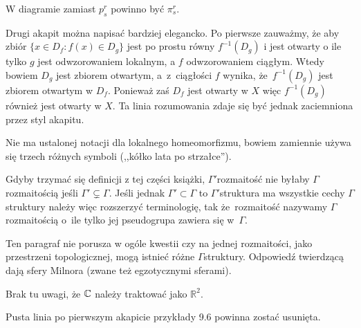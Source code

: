 \documentclass[a4paper,11pt]{article}
\begin{document}
\start {} W diagramie zamiast $p^{ r }_{ s }$ powinno być
$\pi^{ r }_{ s }$.

\start {} Drugi akapit można napisać bardziej elegancko. Po
pierwsze zauważmy, że aby zbiór\linebreak
$\{ x \in D_{ f } : f( x ) \in D_{ g } \}$ jest po prostu równy
$f^{ -1 }( D_{ g } )$ i jest otwarty o ile tylko $g$ jest
odwzorowaniem lokalnym, a $f$ odwzorowaniem ciągłym. Wtedy bowiem
$D_{ g }$ jest zbiorem otwartym, a~z~ciągłości $f$ wynika,
że~$f^{ -1 }( D_{ g } )$ jest zbiorem otwartym w $D_{ f }$. Ponieważ
zaś $D_{ f }$ jest otwarty w $X$ więc $f^{ -1 }( D_{ g } )$ również
jest otwarty w $X$. Ta linia rozumowania zdaje się być jednak
zaciemniona przez styl akapitu.

\start {} Nie ma ustalonej notacji dla lokalnego homeomorfizmu,
bowiem zamiennie używa się trzech różnych symboli (,,kółko lata po
strzałce'').

\start {} Gdyby trzymać się definicji z tej części książki,
$\Gamma'$\dywiz rozmaitość nie byłaby $\Gamma$\dywiz rozmaitością
jeśli $\Gamma' \subsetneq \Gamma$. Jeśli jednak
$\Gamma' \subset \Gamma$ to $\Gamma'$\dywiz struktura ma wszystkie
cechy $\Gamma$\dywiz struktury należy więc rozszerzyć terminologię,
tak że~rozmaitość nazywamy $\Gamma$\dywiz rozmaitością o~ile tylko jej
pseudogrupa zawiera się w~$\Gamma$.

\start {} Ten paragraf nie porusza w ogóle kwestii czy na jednej
rozmaitości, jako przestrzeni topologicznej, mogą istnieć różne
$\Gamma$\dywiz struktury. Odpowiedź twierdzącą dają sfery Milnora
(zwane też egzotycznymi sferami).

\start {} Brak tu uwagi, że $\mathbb{C}$ należy traktować jako
$\mathbb{R}^{ 2 }$.

\start {} Pusta linia po pierwszym akapicie przykłady 9.6
powinna zostać usunięta.

\end{document}
